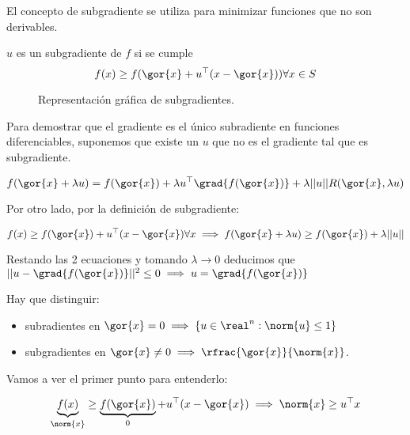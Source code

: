 \begin{problem}[10]
El concepto de subgradiente se utiliza para minimizar funciones que no son derivables.

\solution

\begin{defn}[Subgradiente]
$u$ es un subgradiente de $f$ si se cumple \[f(x) \geq f(\gor{x} + u^\top (x-\gor{x})) \forall x\in S\]
\end{defn}

\begin{figure}[hbtp]
\centering
{}
\caption{Representación gráfica de subgradientes.}
\end{figure}

\ppart

\ppart

Para demostrar que el gradiente es el único subradiente en funciones diferenciables, suponemos que existe un $u$ que no es el gradiente tal que es subgradiente.

\[
    f(\gor{x}+\lambda u) = f(\gor{x}) + \lambda u^\top \grad{f(\gor{x})} + \lambda ||u||R(\gor{x},\lambda u)
\]

Por otro lado, por la definición de subgradiente:

\[
    f(x) \geq f(\gor{x}) + u^\top (x-\gor{x}) \forall x \implies f(\gor{x} + \lambda u) \geq f(\gor{x}) + \lambda ||u||
\]

Restando las 2 ecuaciones y tomando $\lambda \to 0$ deducimos que $||u - \grad{f(\gor{x})}||^2 \leq 0 \implies u = \grad{f(\gor{x})}$

\ppart

Hay que distinguir:
\begin{itemize}
 \item subradientes en $\gor{x} = 0 \implies \{u\in \real^n : \norm{u}\leq 1\}$
 \item subgradientes en $\gor{x} \neq 0\implies \rfrac{\gor{x}}{\norm{x}}$.
\end{itemize}

Vamos a ver el primer punto para entenderlo:

\[
    \underbrace{f(x)}_{\norm{x}}\geq \underbrace{f(\gor{x})}_{0} + u^\top (x-\gor{x}) \implies \norm{x} \geq u^\top x
\]


\end{problem}

